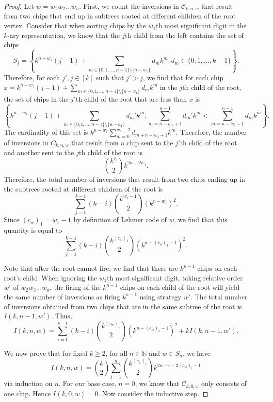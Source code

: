 \documentclass[final]{dmtcs-episciences}
\theoremstyle{definition}
\theoremstyle{remark}
\begin{document}
\begin{proof}
Let $w = w_1w_2\dots w_n$. First, we count the inversions in $\mathcal{C}_{k, n, w}$ that result from two chips that end up in subtrees rooted at different children of the root vertex. Consider that when sorting chips by the $w_1$th most significant digit in the $k$-ary representation, we know that the $j$th child from the left contains the set of chips
$$S_j = \left\{k^{n-w_1}(j-1) + \sum_{m \in \{0,1, \dots, n-1\}\setminus \{n-w_1\}}d_m k^m: d_m \in \{0,1, \dots, k-1\} \right\}.$$
Therefore, for each $j', j \in [k]$ such that $j' > j$, we find that for each chip $x = k^{n-w_1}(j-1)+\sum_{m \in \{0, 1, \dots, n-1\}\setminus \{n-w_1\}}d_mk^m$ in the $j$th child of the root, the set of chips in the $j'$th child of the root that are less than $x$ is
$$\left\{k^{n-w_1}(j-1) + \sum_{m \in \{0,1, \dots, n-1\}\setminus \{n-a_1\} }d_m'k^m: \sum_{m = n-w_1+1}^{n-1}d_m'k^{m} < \sum_{m = n-w_1+1}^{n-1} d_mk^{m} \right\}.$$ The cardinality of this set is $k^{n-w_1}\sum_{m=0}^{w_1-2}d_{m+n-w_1+1}k^m $. Therefore, the number of inversions in $C_{k, n, w}$ that result from a chip sent to the $j'$th child of the root and another sent to the $j$th child of the root is
$$\binom{k^{c_i}}{2}k^{2n-2w_1}.$$
Therefore, the total number of inversions that result from two chips ending up in the subtrees rooted at different children of the root is
$$\sum_{j=1}^{k-1}(k-i)\binom{k^{w_1-1}}{2} (k^{n-w_1})^2.$$
Since $(c_w)_1 = w_1-1$ by definition of Lehmer code of $w$, we find that this quantity is equal to
$$\sum_{j=1}^{k-1}(k-i)\binom{k^{(c_w)_1} }{2} (k^{n-(c_w)_1-1})^2.$$

Note that after the root cannot fire, we find that there are $k^{n-1}$ chips on each root's child. When ignoring the $w_1$th most significant digit, taking relative order $w'$ of $w_2w_3\dots w_n$, the firing of the $k^{n-1}$ chips on each child of the root will yield the same number of inversions as firing $k^{n-1}$ using strategy $w'$. The total number of inversions obtained from two chips that are in the same subtree of the root is $I(k, n-1, w')$. Thus,
\begin{equation}\label{eq:RecursiveRelation}
I(k, n, w) = \sum_{i=1}^{k-1}(k-i)\binom{k^{(c_w)_1} }{ 2} (k^{n-(c_w)_1-1})^2 + k I(k, n-1, w').
\end{equation}

We now prove that for fixed $k \geq 2$, for all $n \in \mathbb{N}$ and $w \in S_n$, we have
\[I(k, n, w) = \binom{k}{2} \sum_{i=1}^{n}\binom{k^{(c_w)_{i}} }{ 2}k^{2n-i-2(c_w)_i-1}\]
via induction on $n$. For our base case, $n=0$, we know that $\mathcal{C}_{k, 0, w}$ only consists of one chip. Hence $I(k,0, w) = 0$. Now consider the inductive step. 


\end{proof}
\end{document}
